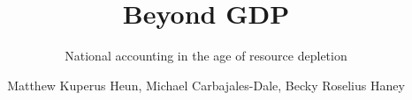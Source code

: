 \documentclass[graybox,envcountchap,sectrefs]{svmono}
\begin{document}
\author{Matthew Kuperus Heun, Michael Carbajales-Dale, Becky Roselius Haney}
\title{Beyond GDP}
\subtitle{National accounting in the age of resource depletion}
\maketitle{}

\glsaddall[types={nomenclature,glossary}]

\frontmatter%

%
%
%
%


\tableofcontents{}
\listoffigures{}
\listoftables{}


\printglossary[type=nomenclature, style=nomenclaturestyle, nonumberlist=true]

\setcounter{chapter}{-3}

{
	\renewcommand{\chaptermark}[1]{ \markboth{#1}{} }

	

	

	 

	
}


\mainmatter%
\end{document}
